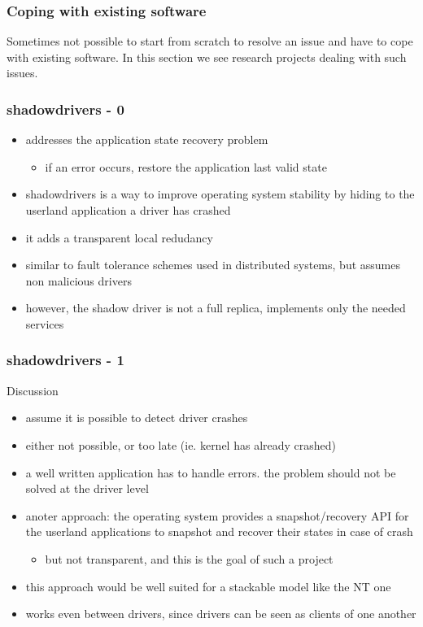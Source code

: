 \begin{frame}
  \frametitle{Coping with existing software}
  Sometimes not possible to start from scratch to resolve an issue and have to cope with
  existing software. In this section we see research projects dealing with such issues.
\end{frame}


\begin{frame}
  \frametitle{shadowdrivers - 0}
  \begin{itemize}
    \item addresses the application state recovery problem
    \begin{itemize} \item if an error occurs, restore the application last valid state \end{itemize}
    \item shadowdrivers is a way to improve operating system stability by hiding to the userland application a driver has crashed
    \item it adds a transparent local redudancy
    \item similar to fault tolerance schemes used in distributed systems, but assumes non malicious drivers
    \item however, the shadow driver is not a full replica, implements only the needed services
  \end{itemize}
\end{frame}


\begin{frame}
  \frametitle{shadowdrivers - 1}
  Discussion
  \begin{itemize}
    \item assume it is possible to detect driver crashes
    \item either not possible, or too late (ie. kernel has already crashed)
    \item a well written application has to handle errors. the problem should not be solved at the driver level
    \item anoter approach: the operating system provides a snapshot/recovery API for the userland applications to snapshot and recover their states in case of crash
      \begin{itemize} \item but not transparent, and this is the goal of such a project \end{itemize}
    \item this approach would be well suited for a stackable model like the NT one
    \item works even between drivers, since drivers can be seen as clients of one another
  \end{itemize}
\end{frame}


